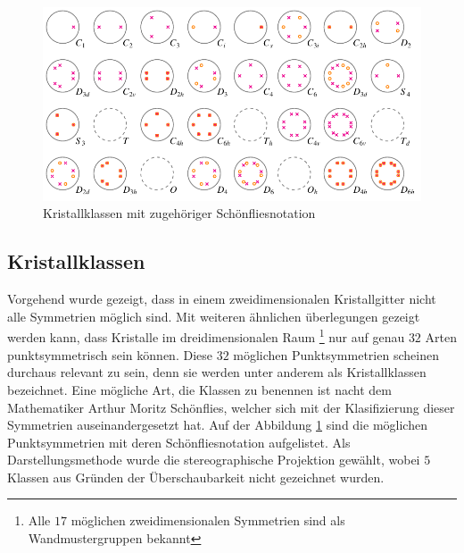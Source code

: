 \begin{figure}
    \centering
    \includegraphics[]{papers/punktgruppen/figures/projections}
    \caption{Kristallklassen mit zugehöriger Schönfliesnotation}
    \label{fig:punktgruppen:Kristallkassen}
\end{figure}

\subsection{Kristallklassen}
Vorgehend wurde gezeigt, dass in einem zweidimensionalen Kristallgitter nicht alle Symmetrien möglich sind.
Mit weiteren ähnlichen überlegungen gezeigt werden kann, dass Kristalle im dreidimensionalen Raum
\footnote{Alle $17$ möglichen zweidimensionalen Symmetrien sind als Wandmustergruppen bekannt} 
nur auf genau $32$ Arten punktsymmetrisch sein können.
Diese $32$ möglichen Punktsymmetrien scheinen durchaus relevant zu sein, denn sie werden unter anderem als Kristallklassen bezeichnet.
Eine mögliche Art, die Klassen zu benennen ist nacht dem Mathematiker Arthur Moritz Schönflies, 
welcher sich mit der Klasifizierung dieser Symmetrien auseinandergesetzt hat.
Auf der Abbildung \ref{fig:punktgruppen:Kristallkassen} sind die möglichen Punktsymmetrien mit deren Schönfliesnotation aufgelistet.
Als Darstellungsmethode wurde die stereographische Projektion gewählt, wobei $5$ Klassen aus Gründen der Überschaubarkeit nicht gezeichnet wurden.  



